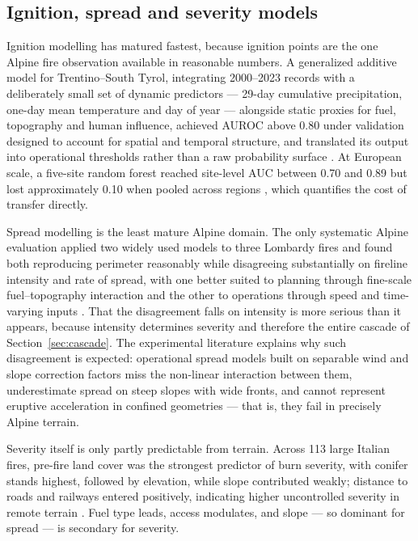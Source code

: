 \documentclass[11pt,a4paper]{article}
\begin{document}
\subsection{Ignition, spread and severity models}

Ignition modelling has matured fastest, because ignition points are the one Alpine fire observation available in reasonable numbers. A generalized additive model for Trentino--South Tyrol, integrating 2000--2023 records with a deliberately small set of dynamic predictors --- 29-day cumulative precipitation, one-day mean temperature and day of year --- alongside static proxies for fuel, topography and human influence, achieved AUROC above 0.80 under validation designed to account for spatial and temporal structure, and translated its output into operational thresholds rather than a raw probability surface \citep{moreno_1_nodate}. At European scale, a five-site random forest reached site-level AUC between 0.70 and 0.89 but lost approximately 0.10 when pooled across regions \citep{gelabert_assessing_2025}, which quantifies the cost of transfer directly.

Spread modelling is the least mature Alpine domain. The only systematic Alpine evaluation applied two widely used models to three Lombardy fires and found both reproducing perimeter reasonably while disagreeing substantially on fireline intensity and rate of spread, with one better suited to planning through fine-scale fuel--topography interaction and the other to operations through speed and time-varying inputs \citep{malanchini_modeling_2025}. That the disagreement falls on intensity is more serious than it appears, because intensity determines severity and therefore the entire cascade of Section~\ref{sec:cascade}. The experimental literature explains why such disagreement is expected: operational spread models built on separable wind and slope correction factors miss the non-linear interaction between them, underestimate spread on steep slopes with wide fronts, and cannot represent eruptive acceleration in confined geometries \citep{hayajneh_wind_2026} --- that is, they fail in precisely Alpine terrain.

Severity itself is only partly predictable from terrain. Across 113 large Italian fires, pre-fire land cover was the strongest predictor of burn severity, with conifer stands highest, followed by elevation, while slope contributed weakly; distance to roads and railways entered positively, indicating higher uncontrolled severity in remote terrain \citep{malandra_burn_2022}. Fuel type leads, access modulates, and slope --- so dominant for spread --- is secondary for severity.
\end{document}
